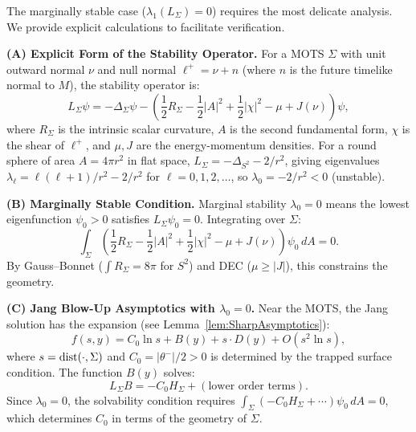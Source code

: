 \begin{remark}\label{rem:MarginallyStableExplicit}
The marginally stable case ($\lambda_1(L_\Sigma) = 0$) requires the most delicate analysis. We provide explicit calculations to facilitate verification.

\textbf{(A) Explicit Form of the Stability Operator.}
For a MOTS $\Sigma$ with unit outward normal $\nu$ and null normal $\ell^+ = \nu + n$ (where $n$ is the future timelike normal to $M$), the stability operator is:
\begin{equation}
    L_\Sigma \psi = -\Delta_\Sigma \psi - \left( \frac{1}{2} R_\Sigma - \frac{1}{2}|A|^2 + \frac{1}{2}|\chi|^2 - \mu + J(\nu) \right) \psi,
\end{equation}
where $R_\Sigma$ is the intrinsic scalar curvature, $A$ is the second fundamental form, $\chi$ is the shear of $\ell^+$, and $\mu, J$ are the energy-momentum densities. For a round sphere of area $A = 4\pi r^2$ in flat space, $L_\Sigma = -\Delta_{S^2} - 2/r^2$, giving eigenvalues $\lambda_\ell = \ell(\ell+1)/r^2 - 2/r^2$ for $\ell = 0, 1, 2, \ldots$, so $\lambda_0 = -2/r^2 < 0$ (unstable).

\textbf{(B) Marginally Stable Condition.}
Marginal stability $\lambda_0 = 0$ means the lowest eigenfunction $\psi_0 > 0$ satisfies $L_\Sigma \psi_0 = 0$. Integrating over $\Sigma$:
\begin{equation}
    \int_\Sigma \left( \frac{1}{2} R_\Sigma - \frac{1}{2}|A|^2 + \frac{1}{2}|\chi|^2 - \mu + J(\nu) \right) \psi_0 \, dA = 0.
\end{equation}
By Gauss--Bonnet ($\int R_\Sigma = 8\pi$ for $S^2$) and DEC ($\mu \ge |J|$), this constrains the geometry.

\textbf{(C) Jang Blow-Up Asymptotics with $\lambda_0 = 0$.}
Near the MOTS, the Jang solution has the expansion (see Lemma~\ref{lem:SharpAsymptotics}):
\begin{equation}
    f(s, y) = C_0 \ln s + B(y) + s \cdot D(y) + O(s^2 \ln s),
\end{equation}
where $s = \mathrm{dist}(\cdot, \Sigma)$ and $C_0 = |\theta^-|/2 > 0$ is determined by the trapped surface condition. The function $B(y)$ solves:
\begin{equation}
    L_\Sigma B = -C_0 H_\Sigma + (\text{lower order terms}).
\end{equation}
Since $\lambda_0 = 0$, the solvability condition requires $\int_\Sigma (-C_0 H_\Sigma + \cdots) \psi_0 \, dA = 0$, which determines $C_0$ in terms of the geometry of $\Sigma$.


\end{remark}
